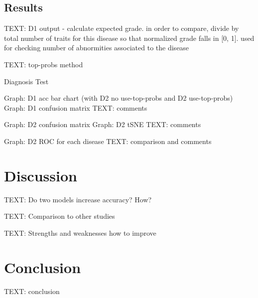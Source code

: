 \documentclass{article}
\begin{document}
				
		\subsection{Results}
			
			TEXT: D1 output - calculate expected grade. in order to compare, divide by total number of traits for this disease so that normalized grade falls in [0, 1]. 
			used for checking number of abnormities associated to the disease
			
			TEXT: top-probs method
			
			\begin{table}[htbp]
				\centering
				\caption{Diagnosis Test}
				\label{tb:diagnosis_test}
			\end{table}
			
			Graph: D1 acc bar chart (with D2 no use-top-probs and D2 use-top-probs)
			Graph: D1 confusion matrix
			TEXT: comments
			
			Graph: D2 confusion matrix
			Graph: D2 tSNE
			TEXT: comments
			
			Graph: D2 ROC for each disease
			TEXT: comparison and comments
	
	\section{Discussion}
		
		TEXT: Do two models increase accuracy? How?
		
		TEXT: Comparison to other studies
		
		TEXT: Strengths and weaknesses
		how to improve
		
	\section{Conclusion}
	
		TEXT: conclusion
\end{document}
